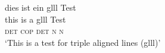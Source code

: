 \ea
 \glll dies ist ein glll Test\\
      this is a glll Test\\
      \textsc{det} \textsc{cop} \textsc{det} \textsc{n} \textsc{n}\\
 \glt `This is a test for triple aligned lines (glll)'
\z